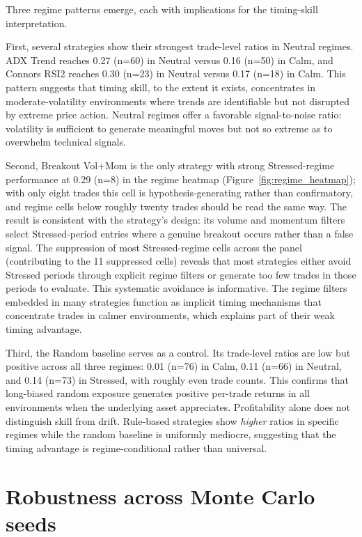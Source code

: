 \documentclass[preprint,12pt]{elsarticle}
\theoremstyle{definition}
\begin{document}
Three regime patterns emerge, each with implications for the timing-skill interpretation.

First, several strategies show their strongest trade-level ratios in Neutral regimes. ADX Trend reaches 0.27 (n=60) in Neutral versus 0.16 (n=50) in Calm, and Connors RSI2 reaches 0.30 (n=23) in Neutral versus 0.17 (n=18) in Calm. This pattern suggests that timing skill, to the extent it exists, concentrates in moderate-volatility environments where trends are identifiable but not disrupted by extreme price action. Neutral regimes offer a favorable signal-to-noise ratio: volatility is sufficient to generate meaningful moves but not so extreme as to overwhelm technical signals.

Second, Breakout Vol+Mom is the only strategy with strong Stressed-regime performance at 0.29 (n=8) in the regime heatmap (Figure~\ref{fig:regime_heatmap}); with only eight trades this cell is hypothesis-generating rather than confirmatory, and regime cells below roughly twenty trades should be read the same way. The result is consistent with the strategy's design: its volume and momentum filters select Stressed-period entries where a genuine breakout occurs rather than a false signal. The suppression of most Stressed-regime cells across the panel (contributing to the 11 suppressed cells) reveals that most strategies either avoid Stressed periods through explicit regime filters or generate too few trades in those periods to evaluate. This systematic avoidance is informative. The regime filters embedded in many strategies function as implicit timing mechanisms that concentrate trades in calmer environments, which explains part of their weak timing advantage.

Third, the Random baseline serves as a control. Its trade-level ratios are low but positive across all three regimes: 0.01 (n=76) in Calm, 0.11 (n=66) in Neutral, and 0.14 (n=73) in Stressed, with roughly even trade counts. This confirms that long-biased random exposure generates positive per-trade returns in all environments when the underlying asset appreciates. Profitability alone does not distinguish skill from drift. Rule-based strategies show \emph{higher} ratios in specific regimes while the random baseline is uniformly mediocre, suggesting that the timing advantage is regime-conditional rather than universal.

\section{Robustness across Monte Carlo seeds}
\end{document}
